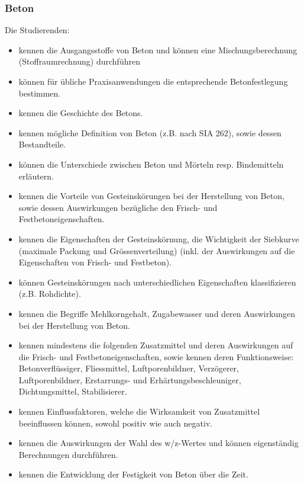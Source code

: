 \subsubsection*{Beton}
Die Studierenden: 

\begin{itemize}[noitemsep]
	\item kennen die Ausgangsstoffe von Beton und können eine Mischungsberechnung (Stoffraumrechnung) durchführen
	\item können für übliche Praxisanwendungen die entsprechende Betonfestlegung bestimmen.
	\item kennen die Geschichte des Betons. 
	\item kennen mögliche Definition von Beton (z.B. nach SIA 262), sowie dessen Bestandteile.
	\item können die Unterschiede zwischen Beton und Mörteln resp. Bindemitteln erläutern. 
	\item kennen die Vorteile von Gesteinskörungen bei der Herstellung von Beton, sowie dessen Auswirkungen bezügliche den Frisch- und Festbetoneigenschaften.
	\item kennen die Eigenschaften der Gesteinskörnung, die Wichtigkeit der Siebkurve (maximale Packung und Grössenverteilung) (inkl. der Auswirkungen auf die Eigenschaften von Frisch- und Festbeton).
	\item können Gesteinskörungen nach unterschiedlichen Eigenschaften klassifizieren (z.B. Rohdichte). 
	\item kennen die Begriffe Mehlkorngehalt, Zugabewasser und deren Auswirkungen bei der Herstellung von Beton.
	\item kennen mindestens die folgenden Zusatzmittel und deren Auswirkungen auf die Frisch- und Festbetoneigenschaften, sowie kennen deren Funktionsweise: Betonverflüssiger, Fliessmittel, Luftporenbildner, Verzögerer, Luftporenbildner, Erstarrungs- und Erhärtungsbeschleuniger, Dichtungsmittel, Stabilisierer. 
	\item kennen Einflussfaktoren, welche die Wirksamkeit von Zusatzmittel beeinflussen können, sowohl positiv wie auch negativ.
	\item kennen die Auswirkungen der Wahl des w/z-Wertes und können eigenständig Berechnungen durchführen.
	\item kennen die Entwicklung der Festigkeit von Beton über die Zeit.
\end{itemize}
